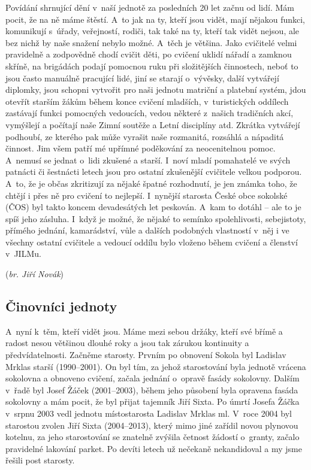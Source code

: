 \documentclass[a5paper, 11pt, twoside]{article}
\begin{document}
Povídání shrnující dění v~naší jednotě za posledních 20 let začnu od
lidí. Mám pocit, že na ně máme štěstí. A~to jak na ty, kteří jsou vidět,
mají nějakou funkci, komunikují s~úřady, veřejností, rodiči, tak také na
ty, kteří tak vidět nejsou, ale bez nichž by naše snažení nebylo možné.
A~těch je většina. Jako cvičitelé velmi pravidelně a zodpovědně chodí
cvičit děti, po cvičení uklidí nářadí a zamknou skříně, na brigádách
podají pomocnou ruku při složitějších činnostech, neboť to jsou často
manuálně pracující lidé, jiní se starají o~vývěsky, další vytvářejí
diplomky, jsou schopni vytvořit pro naši jednotu matriční a platební
systém, jdou otevřít starším žákům během konce cvičení mladších,
v~turistických oddílech zastávají funkci pomocných vedoucích, vedou
některé z~našich tradičních akcí, vymýšlejí a počítají naše Zimní
soutěže a Letní disciplíny atd. Zkrátka vytvářejí podhoubí, ze kterého
pak může vyrašit naše rozmanitá, rozsáhlá a nápaditá činnost. Jim všem
patří mé upřímné poděkování za neocenitelnou pomoc. A~nemusí se jednat
o~lidi zkušené a starší. I~noví mladí pomahatelé ve svých patnácti či
šestnácti letech jsou pro ostatní zkušenější cvičitele velkou podporou.
A~to, že je občas zkritizují za nějaké špatné rozhodnutí, je jen známka
toho, že chtějí i přes ně pro cvičení to nejlepší. I~nynější starosta
České obce sokolské (ČOS) byl takto koncem devadesátých let peskován.
A~kam to dotáhl -- ale to je spíš jeho zásluha. I~když je možné, že nějaké
to semínko spolehlivosti, sebejistoty, přímého jednání, kamarádství,
vůle a dalších podobných vlastností v~něj i ve všechny ostatní cvičitele
a vedoucí oddílu bylo vloženo během cvičení a členství v~JILMu.

\hfill(\textit{br. Jiří Novák})


\subsection{Činovníci jednoty}

A~nyní k~těm, kteří vidět jsou. Máme mezi sebou držáky, kteří své břímě
a radost nesou většinou dlouhé roky a jsou tak zárukou kontinuity a
předvídatelnosti. Začněme starosty. Prvním po obnovení Sokola byl
Ladislav Mrklas starší (1990--2001). On byl tím, za jehož
starostování byla jednotě vrácena sokolovna a obnoveno cvičení, začala
jednání o~opravě fasády sokolovny. Dalším v~řadě byl Josef Žáček
(2001--2003), během jeho působení byla opravena fasáda
sokolovny a mám pocit, že byl přijat tajemník Jiří Sixta. Po úmrtí
Josefa Žáčka v~srpnu 2003 vedl jednotu místostarosta Ladislav Mrklas ml.
V~roce 2004 byl starostou zvolen Jiří Sixta (2004--2013),
který mimo jiné zařídil novou plynovou kotelnu, za jeho starostování se
znatelně zvýšila četnost žádostí o~granty, začalo pravidelné lakování
parket. Po devíti letech už nečekaně nekandidoval a my jsme řešili post
starosty.
\end{document}
